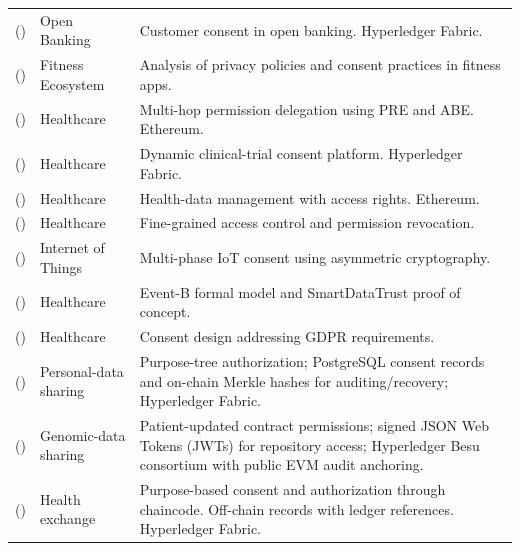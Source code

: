 \begin{longtable}{@{}>{\raggedright\arraybackslash}m{}>{\raggedright\arraybackslash}m{}>{\raggedright\arraybackslash}m{}@{}}
\addlinespace[5pt]
\cite{10.1007/978-981-15-9317-8_3} (\citeyear{10.1007/978-981-15-9317-8_3}) & Open Banking & Customer consent in open banking. Hyperledger Fabric. \\
\addlinespace[5pt]
\cite{10.1145/3511616.3513100} (\citeyear{10.1145/3511616.3513100}) & Fitness Ecosystem & Analysis of privacy policies and consent practices in fitness apps. \\
\addlinespace[5pt]
\cite{10.1016/j.hcc.2022.100084} (\citeyear{10.1016/j.hcc.2022.100084}) & Healthcare & Multi-hop permission delegation using PRE and ABE. Ethereum. \\
\addlinespace[5pt]
\cite{10.3389/fmed.2022.837197} (\citeyear{10.3389/fmed.2022.837197}) & Healthcare & Dynamic clinical-trial consent platform. Hyperledger Fabric. \\
\addlinespace[5pt]
\cite{2022-crowmedII-consent} (\citeyear{2022-crowmedII-consent}) & Healthcare & Health-data management with access rights. Ethereum. \\
\addlinespace[5pt]
\cite{2022-BDSS-blockchain-data-sharing} (\citeyear{2022-BDSS-blockchain-data-sharing}) & Healthcare & Fine-grained access control and permission revocation. \\
\addlinespace[5pt]
\cite{10.1145/3576842.3582379} (\citeyear{10.1145/3576842.3582379}) & Internet of Things & Multi-phase IoT consent using asymmetric cryptography. \\
\addlinespace[5pt]
\cite{10.1016/j.jlamp.2023.100886} (\citeyear{10.1016/j.jlamp.2023.100886}) & Healthcare & Event-B formal model and SmartDataTrust proof of concept. \\
\addlinespace[5pt]
\cite{10.1109/ICOIN56518.2023.10048920} (\citeyear{10.1109/ICOIN56518.2023.10048920}) & Healthcare & Consent design addressing GDPR requirements. \\
\addlinespace[5pt]
\cite{updateCan2024AuditableConsent} (\citeyear{updateCan2024AuditableConsent}) & Personal-data sharing & Purpose-tree authorization; PostgreSQL consent records and on-chain Merkle hashes for auditing/recovery; Hyperledger Fabric. \\
\addlinespace[5pt]
\cite{updateJaved2024SecureConsent} (\citeyear{updateJaved2024SecureConsent}) & Genomic-data sharing & Patient-updated contract permissions; signed JSON Web Tokens (JWTs) for repository access; Hyperledger Besu consortium with public EVM audit anchoring. \\
\addlinespace[5pt]
\cite{updateRohini2024SmartConsent} (\citeyear{updateRohini2024SmartConsent}) & Health exchange & Purpose-based consent and authorization through chaincode. Off-chain records with ledger references. Hyperledger Fabric. \\

\end{longtable}
